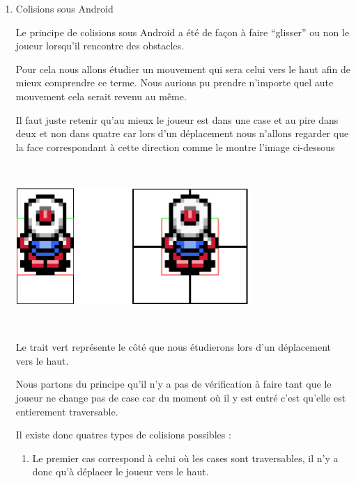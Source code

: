				\begin{enumerate}
				  \item Colisions sous Android
				  
				  		Le principe de colisions sous Android a été de façon à faire ``glisser''
				  		ou non le joueur lorsqu'il rencontre des obstacles.
				  		
				  		
				  		Pour cela nous allons étudier un mouvement qui sera celui vers le haut
				  		afin de mieux comprendre ce terme.
				  		Nous aurions pu prendre n'importe quel aute mouvement cela serait revenu
				  		au même.
				  		
				  		Il faut juste retenir qu'au mieux le joueur est dans une case et au pire
				  		dans deux et non dans quatre car lors d'un déplacement nous n'allons
				  		regarder que la face correspondant à cette direction comme le montre
				  		l'image ci-dessous
				  		
				  		$\,$
				  		
						\begin{center}						
							\includegraphics[width=336px,height=168px]{Developpement/Img/ex2.eps}
						\end{center}
						
				  		$\,$				  		
				  		
				  		Le trait vert représente le côté que nous étudierons lors d'un
				  		déplacement vers le haut.
				  		
				  		
				  		Nous partons du principe qu'il n'y a pas de vérification à faire tant
				  		que le joueur ne change pas de case car du moment où il y est entré
				  		c'est qu'elle est entierement traversable.
				  		
				  		Il existe donc quatres types de colisions possibles :
				  		
				  		\begin{enumerate}

				  		  \item Le premier cas correspond à celui où les cases sont
				  		  traversables, il n'y a donc qu'à déplacer le joueur vers le haut.


\end{enumerate}
\end{enumerate}
